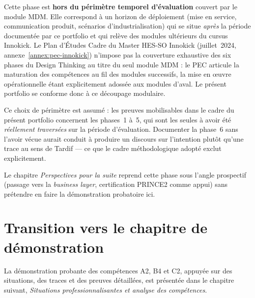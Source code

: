 Cette phase est \textbf{hors du périmètre temporel d'évaluation} couvert par le module MDM. Elle correspond à un horizon de déploiement (mise en service, communication produit, scénarios d'industrialisation) qui se situe \emph{après} la période documentée par ce portfolio et qui relève des modules ultérieurs du cursus Innokick. Le Plan d'Études Cadre du Master HES-SO Innokick (juillet~2024, annexe~\ref{annex:pec-innokick}) n'impose pas la couverture exhaustive des six phases du Design Thinking au titre du seul module MDM : le PEC articule la maturation des compétences au fil des modules successifs, la mise en \oe{}uvre opérationnelle étant explicitement adossée aux modules d'aval. Le présent portfolio se conforme donc à ce découpage modulaire.

Ce choix de périmètre est assumé : les preuves mobilisables dans le cadre du présent portfolio concernent les phases~1 à~5, qui sont les seules à avoir été \emph{réellement traversées} sur la période d'évaluation. Documenter la phase~6 sans l'avoir vécue aurait conduit à produire un discours sur l'intention plutôt qu'une trace au sens de Tardif --- ce que le cadre méthodologique adopté exclut explicitement.

Le chapitre \textit{Perspectives pour la suite} reprend cette phase sous l'angle prospectif (passage vers la \textit{business layer}, certification PRINCE2 comme appui) sans prétendre en faire la démonstration probatoire ici.

\section*{Transition vers le chapitre de démonstration}

La démonstration probante des compétences A2, B4 et C2, appuyée sur des situations, des traces et des preuves détaillées, est présentée dans le chapitre suivant, \textit{Situations professionnalisantes et analyse des compétences}.

\clearpage
\ClearShipoutPictureBG

